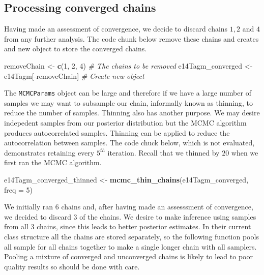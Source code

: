 \documentclass[]{article}
\newenvironment{Shaded}{\begin{snugshade}}{\end{snugshade}}
\newcommand{\KeywordTok}[1]{\textcolor[rgb]{0.13,0.29,0.53}{\textbf{{#1}}}}
\newcommand{\DataTypeTok}[1]{\textcolor[rgb]{0.13,0.29,0.53}{{#1}}}
\newcommand{\DecValTok}[1]{\textcolor[rgb]{0.00,0.00,0.81}{{#1}}}
\newcommand{\StringTok}[1]{\textcolor[rgb]{0.31,0.60,0.02}{{#1}}}
\newcommand{\CommentTok}[1]{\textcolor[rgb]{0.56,0.35,0.01}{\textit{{#1}}}}
\newcommand{\NormalTok}[1]{{#1}}
\begin{document}
\subsection{Processing converged
chains}\label{processing-converged-chains}

Having made an assessment of convergence, we decide to discard chains
\(1,2\) and \(4\) from any further analysis. The code chunk below remove
these chains and creates and new object to store the converged chains.

\begin{Shaded}
\begin{Highlighting}[]
\NormalTok{removeChain <-}\StringTok{ }\KeywordTok{c}\NormalTok{(}\DecValTok{1}\NormalTok{, }\DecValTok{2}\NormalTok{, }\DecValTok{4}\NormalTok{) }\CommentTok{# The chains to be removed}
\NormalTok{e14Tagm_converged <-}\StringTok{ }\NormalTok{e14Tagm[-removeChain] }\CommentTok{# Create new object}
\end{Highlighting}
\end{Shaded}

The \texttt{MCMCParams} object can be large and therefore if we have a
large number of samples we may want to subsample our chain, informally
known as thinning, to reduce the number of samples. Thinning also has
another purpose. We may desire indepedent samples from our posterior
distribution but the MCMC algorithm produces autocorrelated samples.
Thinning can be applied to reduce the autocorrelation between samples.
The code chuck below, which is not evaluated, demonstrates retaining
every \(5^{th}\) iteration. Recall that we thinned by \(20\) when we
first ran the MCMC algorithm.

\begin{Shaded}
\begin{Highlighting}[]
\NormalTok{e14Tagm_converged_thinned <-}\StringTok{ }\KeywordTok{mcmc_thin_chains}\NormalTok{(e14Tagm_converged, }\DataTypeTok{freq  =} \DecValTok{5}\NormalTok{)}
\end{Highlighting}
\end{Shaded}

We initially ran \(6\) chains and, after having made an assesssment of
convergence, we decided to discard \(3\) of the chains. We desire to
make inference using samples from all \(3\) chains, since this leads to
better posterior estimates. In their current class structure all the
chains are stored separately, so the following function pools all sample
for all chains together to make a single longer chain with all samplers.
Pooling a mixture of converged and unconverged chains is likely to lead
to poor quality results so should be done with care.
\end{document}

